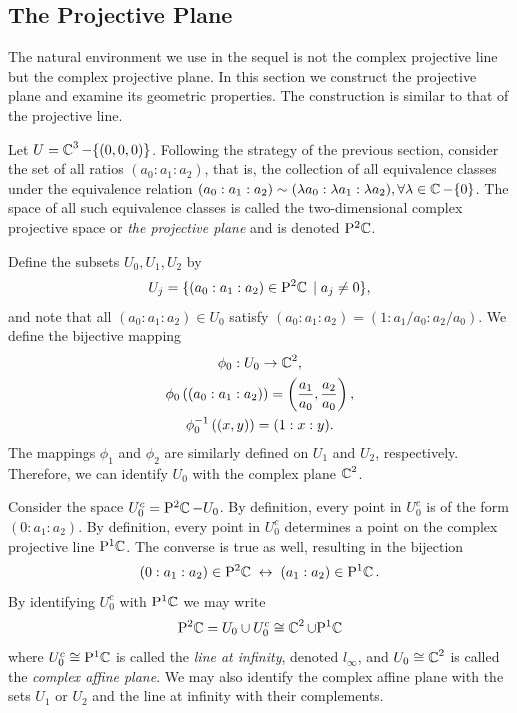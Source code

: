 \subsection{The Projective Plane} \label{sec:projective-plane}

The natural environment we use in the sequel is not the complex projective line
but the complex projective plane. In this section we construct the projective
plane and examine its geometric properties. The construction is similar to that
of the projective line.

Let $U = \operatorname{\mathbb{C}}^3 - \{(0,0,0)\}$. Following the strategy of the previous section,
consider the set of all ratios $(a_0 : a_1 : a_2)$, that is, the collection of
all equivalence classes under the equivalence relation $(a_0 : a_1 : a_2) \sim
(\lambda a_0 : \lambda a_1 : \lambda a_2), \forall \lambda \in \operatorname{\mathbb{C}} - \{0\}$. The
space of all such equivalence classes is called the two-dimensional complex
projective space or {\it the projective plane} and is denoted $\mathrm{P}^2 \!\operatorname{\mathbb{C}}$.

Define the subsets $U_0,U_1,U_2$ by
\[
  U_j = \{ (a_0 : a_1 : a_2) \in \mathrm{P}^2 \!\operatorname{\mathbb{C}} \; | \; a_j \neq 0 \},
\]
and note that all $(a_0 : a_1 : a_2) \in U_0$ satisfy $(a_0 : a_1 : a_2) = (1 :
a_1/a_0 : a_2/a_0)$. We define the bijective mapping
\begin{gather*}
  \phi_0 : U_0 \to \operatorname{\mathbb{C}}^2, \\
  \phi_0 \left( (a_0 : a_1 : a_2) \right) =
  \left( \frac{a_1}{a_0}, \frac{a_2}{a_0} \right), \\
  \phi_0^{-1} \left( (x,y) \right) = (1 : x : y).
\end{gather*}
The mappings $\phi_1$ and $\phi_2$ are similarly defined on $U_1$ and $U_2$,
respectively. Therefore, we can identify $U_0$ with the complex plane $\operatorname{\mathbb{C}}^2$.

Consider the space $U_0^c = \mathrm{P}^2 \!\operatorname{\mathbb{C}} - U_0$. By definition, every point in
$U_0^c$ is of the form $(0 : a_1 : a_2)$. By definition, every point in $U_0^c$
determines a point on the complex projective line $\mathrm{P}^1 \!\operatorname{\mathbb{C}}$. The converse is
true as well, resulting in the bijection
\[
  (0 : a_1 : a_2) \in \mathrm{P}^2 \!\operatorname{\mathbb{C}} \; \leftrightarrow \; (a_1 : a_2) \in \mathrm{P}^1 \!\operatorname{\mathbb{C}}.
\]
By identifying $U_0^c$ with $\mathrm{P}^1 \!\operatorname{\mathbb{C}}$ we may write
\begin{equation} \label{eqn: proejctive-plane} \mathrm{P}^2 \!\operatorname{\mathbb{C}} = U_0 \cup U_0^c \cong
  \operatorname{\mathbb{C}}^2 \cup \mathrm{P}^1 \!\operatorname{\mathbb{C}}
\end{equation}
where $U_0^c \cong \mathrm{P}^1 \!\operatorname{\mathbb{C}}$ is called the {\it line at infinity}, denoted
$l_\infty$, and $U_0 \cong \operatorname{\mathbb{C}}^2$ is called the {\it complex affine plane}. We
may also identify the complex affine plane with the sets $U_1$ or $U_2$ and the
line at infinity with their complements.


